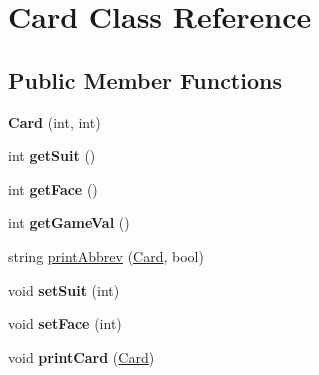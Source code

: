 \hypertarget{class_card}{\section{Card Class Reference}
\label{class_card}
}
\subsection*{Public Member Functions}
\begin{DoxyCompactItemize}
\item 
\hypertarget{class_card_aad945a195000dceb03adfa9980c846ad}{{\bfseries Card} (int, int)}\label{class_card_aad945a195000dceb03adfa9980c846ad}

\item 
\hypertarget{class_card_ad82a99d71c4659f9ff66a716151ef910}{int {\bfseries get\-Suit} ()}\label{class_card_ad82a99d71c4659f9ff66a716151ef910}

\item 
\hypertarget{class_card_a8538ea5ba2f7e9889719f6bad587a22a}{int {\bfseries get\-Face} ()}\label{class_card_a8538ea5ba2f7e9889719f6bad587a22a}

\item 
\hypertarget{class_card_af5dac040b788a9630d9e72ad490dcd26}{int {\bfseries get\-Game\-Val} ()}\label{class_card_af5dac040b788a9630d9e72ad490dcd26}

\item 
string \hyperlink{class_card_a0c7b8b3624b37a1c347745a90e985965}{print\-Abbrev} (\hyperlink{class_card}{Card}, bool)
\item 
\hypertarget{class_card_a6ccd6088377ab1171aa647f987eeeaaf}{void {\bfseries set\-Suit} (int)}\label{class_card_a6ccd6088377ab1171aa647f987eeeaaf}

\item 
\hypertarget{class_card_a9cb8f841e5c6a981336d1814b6569a12}{void {\bfseries set\-Face} (int)}\label{class_card_a9cb8f841e5c6a981336d1814b6569a12}

\item 
\hypertarget{class_card_a5fdb67ed250c91dfdec6cfff67d95648}{void {\bfseries print\-Card} (\hyperlink{class_card}{Card})}\label{class_card_a5fdb67ed250c91dfdec6cfff67d95648}

\end{DoxyCompactItemize}


